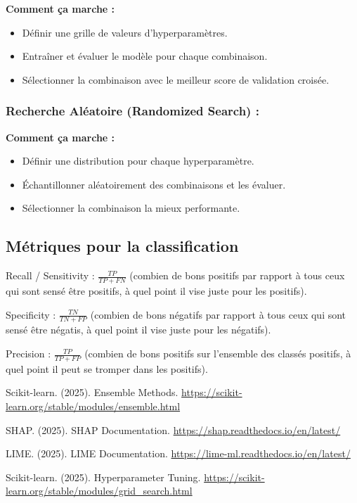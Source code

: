 \documentclass[10pt,a4paper]{article}
\begin{document}
\textbf{Comment ça marche :}
\begin{itemize}
    \item Définir une grille de valeurs d'hyperparamètres.
    \item Entraîner et évaluer le modèle pour chaque combinaison.
    \item Sélectionner la combinaison avec le meilleur score de validation croisée.
\end{itemize}


\subsubsection*{Recherche Aléatoire (Randomized Search) :}

\textbf{Comment ça marche :}
\begin{itemize}
    \item Définir une distribution pour chaque hyperparamètre.
    \item Échantillonner aléatoirement des combinaisons et les évaluer.
    \item Sélectionner la combinaison la mieux performante.
\end{itemize}

\subsection*{Métriques pour la classification}
Recall / Sensitivity : $\frac{TP}{TP + FN}$ (combien de bons positifs par rapport à tous ceux qui sont sensé être positifs, à quel point il vise juste pour les positifs).

Specificity : $\frac{TN}{TN + FP}$ (combien de bons négatifs par rapport à tous ceux qui sont sensé être négatis, à quel point il vise juste pour les négatifs).

Precision : $\frac{TP}{TP + FP}$ (combien de bons positifs sur l'ensemble des classés positifs, à quel point il peut se tromper dans les positifs).


\begin{thebibliography}{9}
Scikit-learn. (2025). Ensemble Methods.
\url{https://scikit-learn.org/stable/modules/ensemble.html}

SHAP. (2025). SHAP Documentation.
\url{https://shap.readthedocs.io/en/latest/}

LIME. (2025). LIME Documentation.
\url{https://lime-ml.readthedocs.io/en/latest/}

Scikit-learn. (2025). Hyperparameter Tuning.
\url{https://scikit-learn.org/stable/modules/grid_search.html}
\end{thebibliography}
\end{document}
